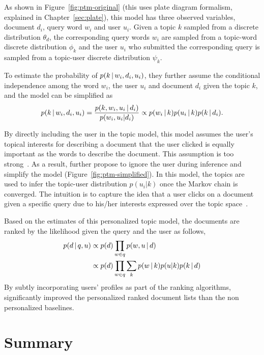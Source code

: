 
As shown in Figure~\ref{fig:ptm-original} (this uses plate diagram
formalism, explained in Chapter~\ref{sec:plate}), this model has three observed
variables, document $d_i$, query word $w_i$ and user $u_i$. Given a topic $k$ sampled
from a discrete distribution $\theta_d$, the corresponding query words $w_i$ are sampled from 
a topic-word discrete distribution $\phi_k$ and the user $u_i$ who submitted the corresponding query 
is sampled from a topic-user discrete distribution $\psi_k$.

To estimate the probability of $p(k \, | \, w_i, d_i, u_i)$,
they further assume the conditional independence among the word $w_i$,
the user $u_i$ and document $d_i$ given the topic $k$, and the model
can be simplified as
\begin{align}
p(k \, | \, w_i, d_i, u_i) = \frac{p(k,w_i, u_i  \, | \,  d_i)}{p(w_i, u_i | d_i)} \propto p(w_i \, | \, k) p(u_i \, | \, k) p (k \, | \, d_i).
\end{align}

By directly including the user in the topic model, this model assumes
the user's topical interests for describing a document that the user
clicked is equally important as the words to describe the
document. This assumption is too strong~\citep{Carman-2010}. As a
result, \citet{Harvey-2013} further propose to ignore the user during
inference and simplify the model (Figure~\ref{fig:ptm-simplified}). In
this model, the topics are used to infer the topic-user distribution
$p(u_i|k)$ once the Markov chain is converged. The intuition is to
capture the idea that a user clicks on a document given a specific
query due to his/her interests expressed over the topic
space~\citep{Harvey-2013}.

Based on the estimates of this personalized topic model, the documents are ranked by the likelihood given the query and the user as follows,
\begin{align}
p(d  \, | \,  q,u) &\propto p(d) \prod_{w \in q} p(w, u  \, | \,  d)\\
&\propto p(d) \prod_{w \in q} \sum_k p(w \, | \, k) p(u|k) p(k \, | \, d) \notag
\end{align}
By subtly incorporating users' profiles as part of the ranking algorithms, \citet{Harvey-2013} significantly improved the personalized ranked document lists than the non personalized baselines.

\section{Summary}

